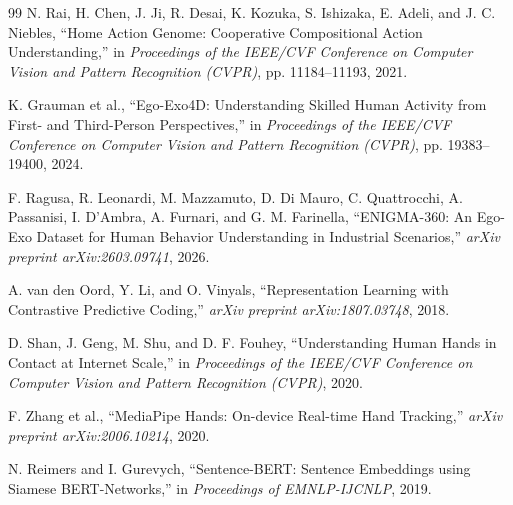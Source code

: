 \documentclass[12pt,a4paper]{report}
\begin{document}
\begin{thebibliography}{99}
N. Rai, H. Chen, J. Ji, R. Desai, K. Kozuka, S. Ishizaka, E. Adeli, and J. C. Niebles,
\newblock ``Home Action Genome: Cooperative Compositional Action Understanding,''
\newblock in \emph{Proceedings of the IEEE/CVF Conference on Computer Vision and Pattern Recognition (CVPR)}, pp. 11184--11193, 2021.

K. Grauman et al.,
\newblock ``Ego-Exo4D: Understanding Skilled Human Activity from First- and Third-Person Perspectives,''
\newblock in \emph{Proceedings of the IEEE/CVF Conference on Computer Vision and Pattern Recognition (CVPR)}, pp. 19383--19400, 2024.

F. Ragusa, R. Leonardi, M. Mazzamuto, D. Di Mauro, C. Quattrocchi, A. Passanisi, I. D'Ambra, A. Furnari, and G. M. Farinella,
\newblock ``ENIGMA-360: An Ego-Exo Dataset for Human Behavior Understanding in Industrial Scenarios,''
\newblock \emph{arXiv preprint arXiv:2603.09741}, 2026.

A. van den Oord, Y. Li, and O. Vinyals,
\newblock ``Representation Learning with Contrastive Predictive Coding,''
\newblock \emph{arXiv preprint arXiv:1807.03748}, 2018.

D. Shan, J. Geng, M. Shu, and D. F. Fouhey,
\newblock ``Understanding Human Hands in Contact at Internet Scale,''
\newblock in \emph{Proceedings of the IEEE/CVF Conference on Computer Vision and Pattern Recognition (CVPR)}, 2020.

F. Zhang et al.,
\newblock ``MediaPipe Hands: On-device Real-time Hand Tracking,''
\newblock \emph{arXiv preprint arXiv:2006.10214}, 2020.

N. Reimers and I. Gurevych,
\newblock ``Sentence-BERT: Sentence Embeddings using Siamese BERT-Networks,''
\newblock in \emph{Proceedings of EMNLP-IJCNLP}, 2019.

\end{thebibliography}
\end{document}
